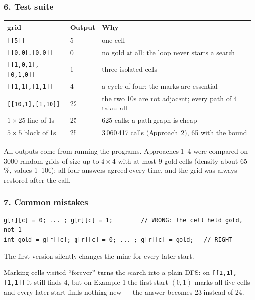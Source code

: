 \subsubsection*{6. Test suite}

\begin{testbox}
\centering\small
\begin{tabular}{@{}p{5.8cm}lp{6.2cm}@{}}
\toprule
\textbf{grid} & \textbf{Output} & \textbf{Why} \\
\midrule
\texttt{[[5]]} & 5 & one cell \\
\texttt{[[0,0],[0,0]]} & 0 & no gold at all: the loop never starts a search \\
\texttt{[[1,0,1],[0,1,0]]} & 1 & three isolated cells \\
\texttt{[[1,1],[1,1]]} & 4 & a cycle of four: the marks are essential \\
\texttt{[[10,1],[1,10]]} & 22 & the two 10s are not adjacent; every path of 4 takes all \\
$1 \times 25$ line of 1s & 25 & 625 calls: a path graph is cheap \\
$5 \times 5$ block of 1s & 25 & 3\,060\,417 calls (Approach~2), 65 with the bound \\
\bottomrule
\end{tabular}
\end{testbox}
All outputs come from running the programs. Approaches 1--4 were compared on $3000$ random grids of size up to $4 \times 4$ with at most 9 gold cells (density about 65\,\%, values 1--100): all four answers agreed every time, and the grid was always restored after the call.

\subsubsection*{7. Common mistakes}

\begin{warningbox}
\begin{lstlisting}[style=snippet]
g[r][c] = 0; ... ; g[r][c] = 1;        // WRONG: the cell held gold, not 1
int gold = g[r][c]; g[r][c] = 0; ... ; g[r][c] = gold;   // RIGHT
\end{lstlisting}
The first version silently changes the mine for every later start.
\end{warningbox}

\begin{warningbox}
Marking cells visited ``forever'' turns the search into a plain DFS: on \texttt{[[1,1],[1,1]]} it still finds 4, but on Example 1 the first start $(0,1)$ marks all five cells and every later start finds nothing new --- the answer becomes 23 instead of 24.
\end{warningbox}

